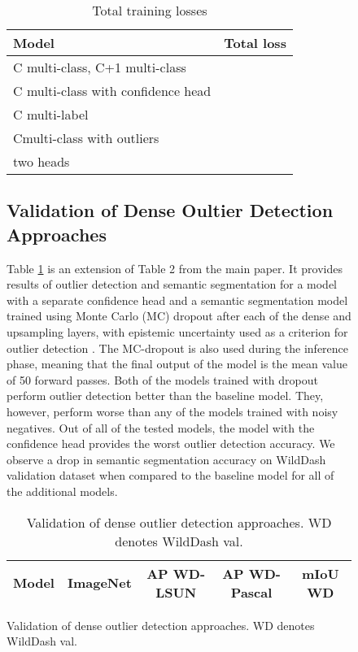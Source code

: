 \documentclass[runningheads]{llncs}
\begin{document}
\begin{figure}[htb]
\clearpage
\begin{table}[htb!]
\centering
\caption{Total training losses}
\label{table:total-losses}
\begin{tabular}{l|c}
  \hline
 Model & Total loss\\
 \hline
  \hline
 C multi-class, C+1 multi-class & 
  
 \\
 C multi-class with confidence head & 
 
 \\
 C multi-label &
 
\\
 Cmulti-class with outliers &
 
\\
 two heads &
  
\\
\hline
\end{tabular}
\end{table}
\subsection{Validation of Dense Oultier Detection Approaches}
Table \ref{table:OOD_detection} is an extension of Table 2
from the main paper. It provides results of outlier detection
and semantic segmentation for a model with a separate
confidence head \cite{devries18arxiv} and a semantic segmentation
model trained using Monte Carlo (MC) dropout after each of the dense
and upsampling layers, with epistemic uncertainty
used as a criterion for outlier detection \cite{kendall17nips,kendall15arxiv}.
The MC-dropout is also used during the inference phase,
meaning that the final output of the model is the mean value of
50 forward passes.
Both of the models trained with
dropout perform outlier detection
better than the baseline model. They, however,
perform worse than any of the
models trained with noisy negatives.
Out of all of the tested models, 
the model with the confidence head
provides the worst
outlier detection accuracy.
We observe a drop in semantic
segmentation accuracy on WildDash 
validation dataset
when compared to the baseline model
for all of the additional models.

\begin{table}[htb!]
\centering
\caption{Validation of dense 
  outlier detection approaches.
  WD denotes WildDash val.}
\label{table:OOD_detection}
\begin{tabular}{|c|c||c|c|c|}
  \hline
  Model & ImageNet &
    \multicolumn{1}{c|}{AP WD-LSUN} &
    \multicolumn{1}{c|}{AP WD-Pascal} &
    \multicolumn{1}{c|}{mIoU WD}\\
 \hline


\end{tabular}
\end{table}
\end{figure}
\end{document}
